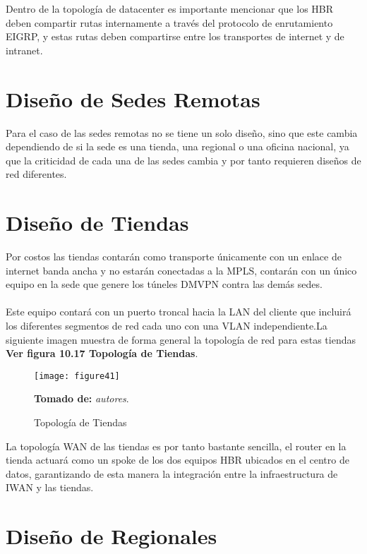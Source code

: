 Dentro de la topología de datacenter es importante mencionar que los HBR deben compartir rutas internamente a través del protocolo de enrutamiento EIGRP, y estas rutas deben compartirse entre los transportes de internet y de intranet.

\section{Diseño de Sedes Remotas}
\label{sec:Diseño de Sedes Remotas}

Para el caso de las sedes remotas no se tiene un solo diseño, sino que este cambia dependiendo de si la sede es una tienda, una regional o una oficina nacional, ya que la criticidad de cada una de las sedes cambia y por tanto requieren diseños de red diferentes.

\section{Diseño de Tiendas} %
\label{sec:Diseño de Tiendas}

Por costos las tiendas contarán como transporte únicamente con un enlace de internet banda ancha y no estarán conectadas a la MPLS, contarán con un único equipo en la sede que genere los túneles DMVPN contra las demás sedes.
\\
\\
Este equipo contará con un puerto troncal hacia la LAN del cliente que incluirá los diferentes segmentos de red cada uno con una VLAN independiente.La siguiente imagen muestra de forma general la topología de red para estas tiendas \textbf{Ver figura 10.17 Topología de Tiendas}.

\begin{figure}[htbp]
  \centering
    {\texttt{[image: figure41]}}%
  \caption{\footnotesize{Topología de Tiendas}}
  \footnotesize{ \textbf{Tomado de:} \textit{autores}.}
  \label{fig:fig2subfig}
\end{figure}

La topología WAN de las tiendas es por tanto bastante sencilla, el router en la tienda actuará como un spoke de los dos equipos HBR ubicados en el centro de datos, garantizando de esta manera la integración entre la infraestructura de IWAN y las tiendas.

\section{Diseño de Regionales} %
\label{sec:Diseño de Regionales}


